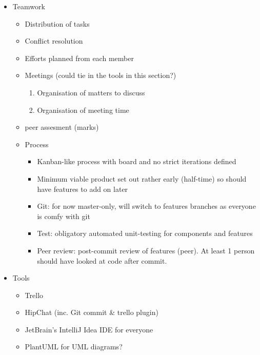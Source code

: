 \begin{itemize}
	\item Teamwork
	\begin{itemize}
		\item Distribution of tasks
    	\item Conflict resolution
    	\item Efforts planned from each member
    	\item Meetings (could tie in the tools in this section?)
        \begin{enumerate}
            \item Organisation of matters to discuss
            \item Organisation of meeting time
        \end{enumerate}
        \item peer assesment (marks)

        \item Process
        \begin{itemize}
            \item Kanban-like process with board and no strict iterations defined
            \item Minimum viable product set out rather early (half-time) so should have features to add on later
            \item Git: for now master-only, will switch to features branches as everyone is comfy with git
            \item Test: obligatory automated unit-testing for components and features
            \item Peer review: post-commit review of features (peer). At least 1 person should have looked at code after commit.
        \end{itemize}
	\end{itemize}

	\item Tools
	\begin{itemize}
		\item Trello
		\item HipChat (inc. Git commit \& trello plugin)
	    \item JetBrain's IntelliJ Idea IDE for everyone
	    \item PlantUML for UML diagrams?
	\end{itemize}

\end{itemize}



